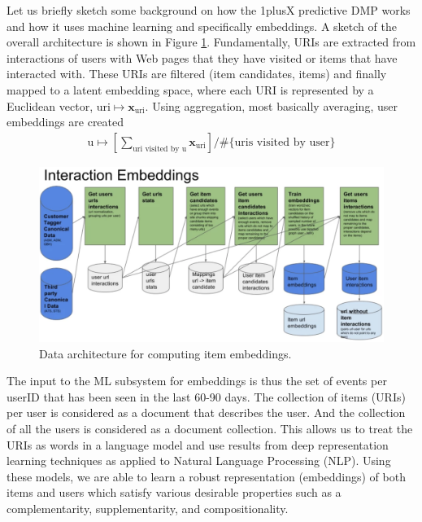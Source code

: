 \documentclass{article}
\begin{document}
Let us briefly sketch some background on how the 1plusX predictive DMP works and how it uses machine learning and specifically embeddings.  A sketch of the overall architecture is shown in Figure \ref{fig:architecture}. Fundamentally, URIs are extracted from interactions of users with Web pages that they have visited or items that have interacted with. These URIs are filtered (item candidates, items) and finally mapped to a latent embedding space, where each URI is represented by a Euclidean vector, $\text{uri} \mapsto \mathbf x_{\text{uri}}$. Using aggregation, most basically averaging, user embeddings are created 
\begin{align}
\text{u} \mapsto \left[ \sum_{ \text{uri visited by u}}  \mathbf x _{\text{uri}}  \right] \Big/  \# \{ \text{uris visited by user}\}
\end{align}
\begin{figure}
\begin{center}
\includegraphics[width=1.0\textwidth]{interaction_embeddings}
\end{center}
\caption{Data architecture for computing item embeddings.}
\label{fig:architecture}
\end{figure}

The input to the ML subsystem for embeddings is thus the set of events per userID that has been seen in the last 60-90 days. The collection of items (URIs) per user is considered as a document that describes the user. And the collection of all the users is considered as a document collection. This allows us to treat the URIs as words in a language model and use results from deep representation learning techniques as applied to Natural Language Processing (NLP). Using these models, we are able to learn a robust representation (embeddings) of both items and users which satisfy various desirable properties such as a complementarity, supplementarity, and compositionality. 
\end{document}
